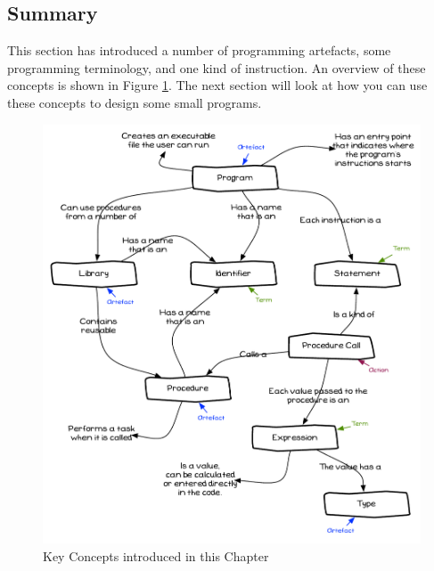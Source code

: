 
\clearpage
\subsection{Summary} %
\label{sub:program_creation_concepts_summary}

This section has introduced a number of programming artefacts, some programming terminology, and one kind of instruction. An overview of these concepts is shown in Figure \ref{fig:program-creation-summary}. The next section will look at how you can use these concepts to design some small programs.

\begin{figure}[h]
   \centering
   \includegraphics[width=\textwidth]{./topics/program-creation/diagrams/Summary} 
   \caption[Chapter Concepts]{Key Concepts introduced in this Chapter}
   \label{fig:program-creation-summary}
\end{figure}


